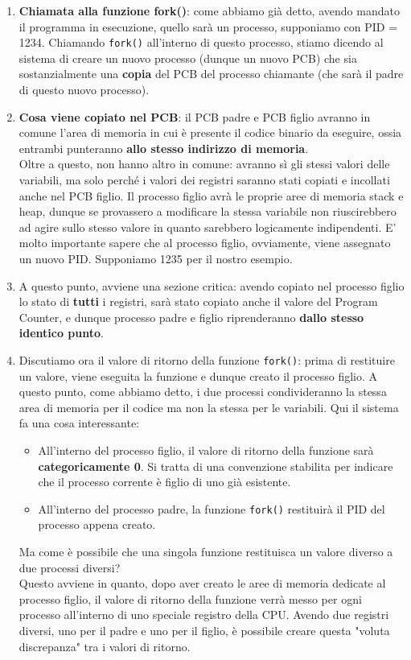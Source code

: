 \documentclass[12pt]{report}
\begin{document}
	\begin{enumerate}
		\item \textbf{Chiamata alla funzione fork()}: come abbiamo già detto, avendo mandato il programma in esecuzione, quello sarà un processo, supponiamo con PID = 1234. Chiamando \texttt{fork()} all'interno di questo processo, stiamo dicendo al sistema di creare un nuovo processo (dunque un nuovo PCB) che sia sostanzialmente una \textbf{copia} del PCB del processo chiamante (che sarà il padre di questo nuovo processo).
		
		\item \textbf{Cosa viene copiato nel PCB}: il PCB padre e PCB figlio avranno in comune l'area di memoria in cui è presente il codice binario da eseguire, ossia entrambi punteranno \textbf{allo stesso indirizzo di memoria}.\\
		Oltre a questo, non hanno altro in comune: avranno sì gli stessi valori delle variabili, ma solo perché i valori dei registri saranno stati copiati e incollati anche nel PCB figlio. Il processo figlio avrà le proprie aree di memoria stack e heap, dunque se provassero a modificare la stessa variabile non riuscirebbero ad agire sullo stesso valore in quanto sarebbero logicamente indipendenti. E' molto importante sapere che al processo figlio, ovviamente, viene assegnato un nuovo PID. Supponiamo 1235 per il nostro esempio.
		
		\item A questo punto, avviene una sezione critica: avendo copiato nel processo figlio lo stato di \textbf{tutti} i registri, sarà stato copiato anche il valore del Program Counter, e dunque processo padre e figlio riprenderanno \textbf{dallo stesso identico punto}.
		
		\item Discutiamo ora il valore di ritorno della funzione \texttt{fork()}: prima di restituire un valore, viene eseguita la funzione e dunque creato il processo figlio. A questo punto, come abbiamo detto, i due processi condivideranno la stessa area di memoria per il codice ma non la stessa per le variabili. Qui il sistema fa una cosa interessante:
		\begin{itemize}
			\item All'interno del processo figlio, il valore di ritorno della funzione sarà \textbf{categoricamente 0}. Si tratta di una convenzione stabilita per indicare che il processo corrente è figlio di uno già esistente.
			\item All'interno del processo padre, la funzione \texttt{fork()} restituirà il PID del processo appena creato.
		\end{itemize}
		Ma come è possibile che una singola funzione restituisca un valore diverso a due processi diversi?\\
		Questo avviene in quanto, dopo aver creato le aree di memoria dedicate al processo figlio, il valore di ritorno della funzione verrà messo per ogni processo all'interno di uno speciale registro della CPU. Avendo due registri diversi, uno per il padre e uno per il figlio, è possibile creare questa "voluta discrepanza" tra i valori di ritorno.
		

\end{enumerate}
\end{document}
